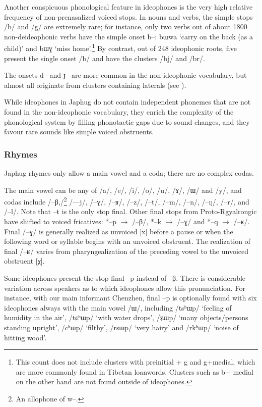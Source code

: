 \documentclass[oldfontcommands,oneside,a4paper,11pt]{article}
\newcommand{\ipa}[1]{{\phon \mbox{#1}}} %
\begin{document}
Another conspicuous phonological feature in ideophones is the very high relative frequency of non-prenasalized voiced stops. In nouns and verbs, the simple stops /\ipa{b}/ and /\ipa{g}/ are extremely rare; for instance, only two verbs out of about 1800 non-deideophonic verbs have the simple onset \ipa{b--}: \ipa{bɯwa} `carry on the back (as a child)' and \ipa{bɯɣ} `miss home'.\footnote{This count does not include clusters with preinitial + \ipa{g} and \ipa{g}+medial, which are more commonly found in Tibetan loanwords. Clusters such as \ipa{b}+ medial on the other hand are not found outside of ideophones.}  By contrast, out of 248 ideophonic roots, five present the single onset /\ipa{b}/ and  have the clusters  /\ipa{bj}/ and  /\ipa{br}/.

The onsets \ipa{d--} and \ipa{ɟ--} are more common in the non-ideophonic vocabulary, but almost all originate from clusters containing laterals (see \citealt[313-4]{jacques04these}).

While ideophones in Japhug do not contain independent phonemes that are not found  in the non-ideophonic vocabulary, they enrich the complexity of the phonological system by filling phonotactic gaps due to sound changes, and they favour rare sounds like simple voiced obstruents.

 \subsubsection{Rhymes}
 Japhug rhymes only allow a main vowel and a coda; there are no complex codas.
 
 The main vowel can be any of /\ipa{a}/,  /\ipa{e}/,  /\ipa{i}/,  /\ipa{o}/,  /\ipa{u}/,  /\ipa{ɤ}/,  /\ipa{ɯ}/ and /\ipa{y}/, and codas include /\ipa{--β},/\footnote{An allophone of \ipa{w--}.} /\ipa{---j}/, /\ipa{--ɣ}/, /\ipa{--ʁ}/, /\ipa{--z}/, /\ipa{--t}/, /\ipa{--m}/, /\ipa{--n}/, /\ipa{--ŋ}/, /\ipa{--r}/, and /\ipa{--l}/. Note that \ipa{--t} is the only stop final. Other final stops from Proto-Rgyalrongic have shifted to voiced fricatives: *--p $\rightarrow$ /\ipa{--β}/,  *--k $\rightarrow$ /\ipa{--ɣ}/ and  *--q $\rightarrow$ /\ipa{--ʁ}/. Final /\ipa{--ɣ}/ is generally realized as unvoiced [x] before a pause or when the following word or syllable begins with an unvoiced obstruent. The realization of final /\ipa{--ʁ}/ varies from pharyngealization of the preceding vowel to the  unvoiced obstruent [χ].
 
Some ideophones present  the stop final  \ipa{--p} instead of \ipa{--β}. There is considerable variation across speakers as to which ideophones allow this pronunciation. For instance, with our main informant Chenzhen, final \ipa{--p} is optionally found with six ideophones always with the main vowel /\ipa{ɯ}/, including /\ipa{tsʰɯp}/ `feeling of humidity in the air', /\ipa{tɕʰɯp}/ `with water drops', /\ipa{ʑɯp}/ `many objects/persons standing upright', /\ipa{cʰɯp}/ `filthy', /\ipa{rsɯp}/ `very hairy' and /\ipa{rkʰɯp}/ `noise of hitting wood'.
\end{document}

